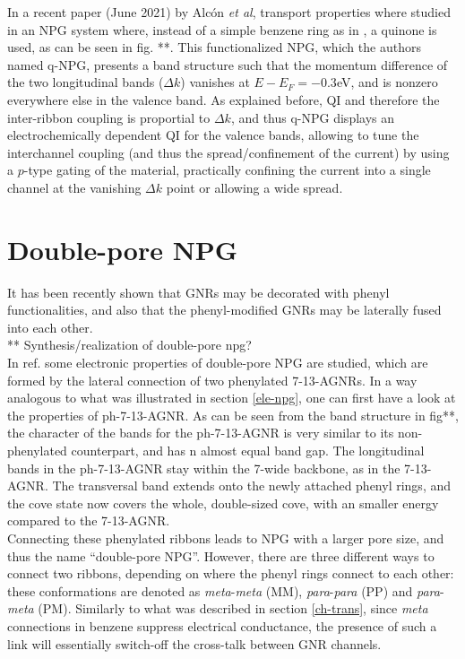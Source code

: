 In a recent paper (June 2021) by Alcón \textit{et al}\parencite{Alcon2021}, transport properties where studied in an NPG system where, instead of a simple benzene ring as in \parencite{Calogero2019a}, a quinone is used, as can be seen in fig. **. This functionalized NPG, which the authors named q-NPG, presents a band structure such that the momentum difference of the two longitudinal bands (\(\Delta k\)) vanishes at \(E-E_F=-0.3\)eV, and is nonzero everywhere else in the valence band. As explained before, QI and therefore the inter-ribbon coupling is proportial to \(\Delta k\)\parencite{Calogero2019}, and thus q-NPG displays an electrochemically dependent QI for the valence bands, allowing to tune the interchannel coupling (and thus the spread/confinement of the current) by using a \(p\)-type gating of the material, practically confining the current into a single channel at the vanishing \(\Delta k\) point or allowing a wide spread.


\section{Double-pore NPG}
It has been recently shown that GNRs may be decorated with phenyl functionalities, and also that the phenyl-modified GNRs may be laterally fused into each other\parencite{Shekhirev2018}.\\

** Synthesis/realization of double-pore npg?\\

In ref. \parencite{Kretz2018} some electronic properties of double-pore NPG are studied, which are formed by the lateral connection of two phenylated 7-13-AGNRs. In a way analogous to what was illustrated in section \ref{ele-npg}, one can first have a look at the properties of ph-7-13-AGNR. As can be seen from the band structure in fig**, the character of the bands for the ph-7-13-AGNR is very similar to its non-phenylated counterpart, and has n almost equal band gap. The longitudinal bands in the ph-7-13-AGNR stay within the 7-wide backbone, as in the 7-13-AGNR. The transversal band extends onto the newly attached phenyl rings, and the cove state now covers the whole, double-sized cove, with an smaller energy compared to the 7-13-AGNR.\\

Connecting these phenylated ribbons leads to NPG with a larger
pore size, and thus the name ``double-pore NPG''. However, there are three different ways to connect two ribbons, depending on where the phenyl rings connect to each other: these conformations are denoted as \textit{meta}-\textit{meta} (MM), \textit{para}-\textit{para} (PP) and
\textit{para}-\textit{meta} (PM)\parencite{Kretz2018}. Similarly to what was described in section \ref{ch-trans}, since \textit{meta} connections in benzene suppress electrical conductance, the presence of such a link will essentially switch-off the cross-talk between GNR channels.\\

